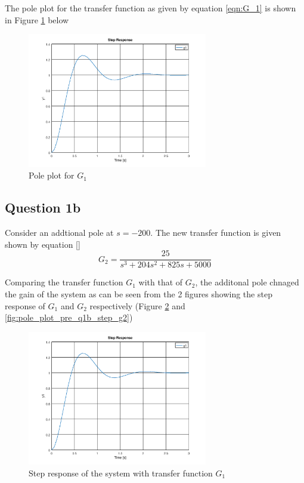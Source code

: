 \documentclass[12pt, a4paper]{article}
\begin{document}
		The pole plot for the transfer function as given by equation \ref{eqn:G_1} is shown in Figure \ref{fig:pole_plot_pre_g1a} below

		\begin{figure}[H]
			\centering
				\includegraphics[width=0.7\textwidth]{Images/pole_plot_pre_q1a.png}
				\caption{Pole plot for $G_1$}
				\label{fig:pole_plot_pre_g1a} 
		\end{figure}

		\subsection{Question 1b} %
		\label{sub:question_1b}
			Consider an addtional pole at $s=-200$. The new transfer function is given shown by equation \ref{}
			\begin{equation}
				G_2 = \frac{25}{s^3+204s^2+825s+5000}
			\end{equation}

			Comparing the transfer function $G_1$ with that of $G_2$, the additonal pole chnaged the gain of the system as can be seen from the 2 figures showing the step response of $G_1$ and $G_2$ respectively (Figure \ref{fig:pole_plot_pre_q1b_step_g1} and \ref{fig:pole_plot_pre_q1b_step_g2})

			\begin{figure}[H]
				\centering
				\includegraphics[width=0.7\textwidth]{Images/pole_plot_pre_q1b_step_g1.png}
				\caption{Step response of the system with transfer function $G_1$}
				\label{fig:pole_plot_pre_q1b_step_g1}
			\end{figure}
\end{document}
